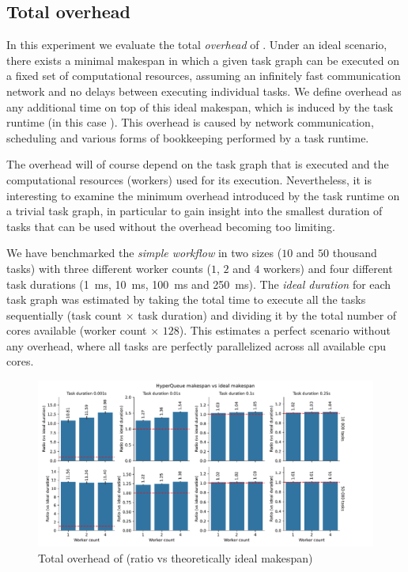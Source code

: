 \subsection{Total overhead}
\label{sec:hq-exp-total-overhead}
In this experiment we evaluate the total \emph{overhead} of \hyperqueue{}. Under
an ideal scenario, there exists a minimal makespan in which a given task graph can be executed on a
fixed set of computational resources, assuming an infinitely fast communication network and no
delays between executing individual tasks. We define overhead as any additional time on top of this
ideal makespan, which is induced by the task runtime (in this case \hyperqueue{}). This
overhead is caused by network communication, scheduling and various forms of bookkeeping
performed by a task runtime.

The overhead will of course depend on the task graph that is executed and the computational
resources (workers) used for its execution. Nevertheless, it is interesting to examine the minimum
overhead introduced by the task runtime on a trivial task graph, in particular to gain insight into
the smallest duration of tasks that can be used without the overhead becoming too limiting.

We have benchmarked the \emph{simple workflow} in two sizes ($10$ and
$50$ thousand tasks) with three different worker counts ($1$,
$2$ and $4$ workers) and four different task durations
(\SI{1}{\milli\second}, \SI{10}{\milli\second}, \SI{100}{\milli\second} and
\SI{250}{\milli\second}). The \emph{ideal duration} for each task graph was estimated by taking
the total time to execute all the tasks sequentially (task count $\times$ task duration) and
dividing it by the total number of cores available (worker count $\times$ $128$). This estimates a
perfect scenario without any overhead, where all tasks are perfectly parallelized across all
available \gls{cpu} cores.

\begin{figure}[h]
	\centering
	\includegraphics[width=\textwidth]{imgs/hq/charts/total-overhead-vs-ideal}
	\caption{Total overhead of \hyperqueue{} (ratio vs theoretically ideal makespan)}
	\label{fig:hq-overhead-vs-ideal}
\end{figure}

